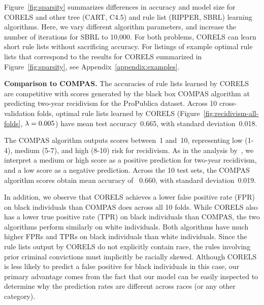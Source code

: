 Figure~\ref{fig:sparsity} summarizes differences in accuracy and model size
for CORELS and other tree (CART, C4.5) and rule list (RIPPER, SBRL) learning algorithms.
%
Here, we vary different algorithm parameters, and increase the number of iterations for SBRL to 10,000.
%
For both problems, CORELS can learn short rule lists without sacrificing accuracy.
%
For listings of example optimal rule lists that correspond to the results
for CORELS summarized in Figure~\ref{fig:sparsity}, see Appendix~\ref{appendix:examples}.

\textbf{Comparison to COMPAS.}
The accuracies of rule lists learned by CORELS are competitive with
scores generated by the black box COMPAS algorithm
at predicting two-year recidivism for the ProPublica dataset.
%
Across 10 cross-validation folds, optimal rule lists learned by CORELS
(Figure~\ref{fig:recidivism-all-folds}, ${{\lambda} = 0.005}$)
have mean test accuracy~0.665, with standard deviation~0.018.

The COMPAS algorithm outputs scores between~1 and~10,
representing low (1-4), medium (5-7), and high (8-10) risk for recidivism.
%
As in the analysis by~\citep{LarsonMaKiAn16}, we interpret a medium or high score
as a positive prediction for two-year recidivism, and a low score as a negative prediction.
%
Across the 10 test sets, the COMPAS algorithm scores obtain
mean accuracy of ~0.660, with standard deviation~0.019.

In addition, we observe that CORELS achieves a lower false positive rate (FPR) on black individuals than COMPAS does across all 10 folds.
%
While CORELS also has a lower true positive rate (TPR) on black individuals than COMPAS, the two algorithms perform similarly on white individuals.
%
Both algorithms have much higher FPRs and TPRs on black individuals than white individuals.
%
Since the rule lists output by CORELS do not explicitly contain race, the rules involving prior criminal convictions must implicitly be racially skewed.
%
Although CORELS is less likely to predict a false positive for black individuals in this case, our primary advantage comes from the fact that our model can be easily inspected to determine why the prediction rates are different across races (or any other category).

